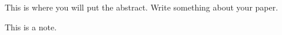\begin{thesisabstract}

This is where you will put the abstract. Write something about your paper.

This is a note.

\end{thesisabstract}